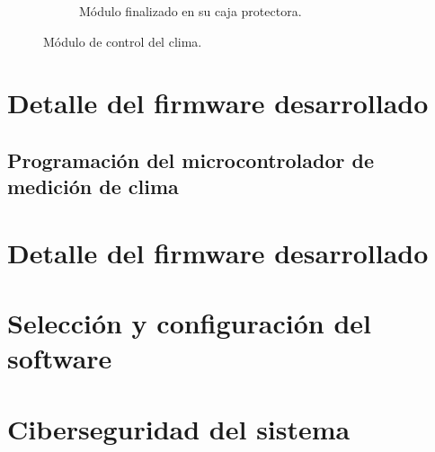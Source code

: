 \begin{figure}[!htpb]
\begin{subfigure}[b]{0.45\textwidth}
		\caption{Módulo finalizado en su caja protectora.}
		\label{fig:vent3}
     \end{subfigure}
     \hfill
        \caption[Módulo de control del clima]{Módulo de control del clima.}
        \label{fig:soilsenors}
\end{figure}




\section{Detalle del firmware desarrollado}
\label{sec:Desarrollo del firmware}


\subsection{Programación del microcontrolador de medición de clima}
\label{Programación del microcontrolador de medición de clima}

\section{Detalle del firmware desarrollado}
\label{sec:Desarrollo del firmware}


\section{Selección y configuración del software}
\label{sec:Selección y configuración del software}

\section{Ciberseguridad del sistema}
\label{sec:Ciberseguridad del sistema}
